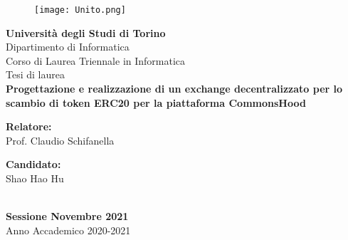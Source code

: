 \begin{titlepage}
    \begin{figure}[t] 
        \centering\texttt{[image: Unito.png]} 
        \label{fig:logoUniTo} 
       \end{figure} 
    \linespread{1}
    \begin{center} 
     \LARGE\textbf{Università degli Studi di Torino}
     \\
     \vspace*{0.5cm}
     \LARGE{Dipartimento di Informatica}
     \\
     \large{Corso di Laurea Triennale in Informatica} 
     \\ 
     \vspace{1.5cm} 
     \large\large{Tesi di laurea}
     \\
     \LARGE\textbf{Progettazione e realizzazione di un exchange decentralizzato per lo scambio di token ERC20 per la piattaforma CommonsHood} 
     \\ 
     \vspace*{3cm} 
     \begin{minipage}{6cm} 
      \begin{flushleft} 
       \large\textbf{Relatore:} 
       \\ 
       \large{Prof. Claudio Schifanella} 
      \end{flushleft} 
     \end{minipage} 
     \hfill 
     \begin{minipage}{6cm} 
      \begin{flushright} 
       \large\textbf{Candidato:} 
       \\ 
       \large{Shao Hao Hu} 
      \end{flushright} 
     \end{minipage} 
     \\ 
     \vspace*{\fill} 
     \large\textbf{Sessione Novembre 2021} 
     \\ 
     \large{Anno Accademico 2020-2021} 
    \end{center} 
\end{titlepage}